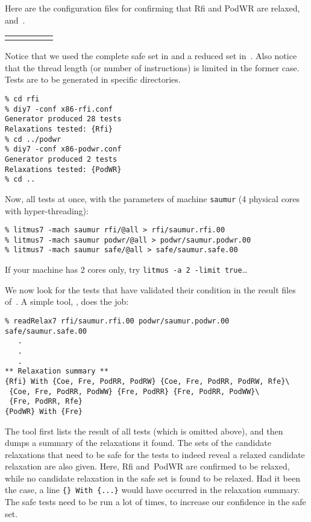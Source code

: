 Here are the configuration files for confirming
that Rfi and PodWR are relaxed, 
and~.
\begin{center}\small
\begin{tabular}{p{0.7\linewidth}@{\quad}|@{\quad}p{0.2\linewidth}}
 &

\end{tabular}
\end{center}
Notice that we used the complete safe set in
 and a reduced set in~.
Also notice that the thread length (or number of instructions) is limited in the former case.
Tests are to be generated in specific directories.
\begin{verbatim}
% cd rfi
% diy7 -conf x86-rfi.conf
Generator produced 28 tests
Relaxations tested: {Rfi}
% cd ../podwr
% diy7 -conf x86-podwr.conf
Generator produced 2 tests
Relaxations tested: {PodWR}
% cd ..
\end{verbatim}

Now,  all tests at once, with the
parameters of machine \texttt{saumur} (4 physical cores with hyper-threading):
\begin{verbatim}
% litmus7 -mach saumur rfi/@all > rfi/saumur.rfi.00
% litmus7 -mach saumur podwr/@all > podwr/saumur.podwr.00
% litmus7 -mach saumur safe/@all > safe/saumur.safe.00
\end{verbatim}
If your machine has 2 cores only, try \verb+litmus -a 2 -limit true+\ldots

\label{readRelax:intro}We now look for
the tests that have validated their condition
in the result files of~\litmus.
A simple tool, \readRelax, does the job:
\begin{verbatim}
% readRelax7 rfi/saumur.rfi.00 podwr/saumur.podwr.00 safe/saumur.safe.00
   .
   .
   .
** Relaxation summary **
{Rfi} With {Coe, Fre, PodRR, PodRW} {Coe, Fre, PodRR, PodRW, Rfe}\
 {Coe, Fre, PodRR, PodWW} {Fre, PodRR} {Fre, PodRR, PodWW}\
 {Fre, PodRR, Rfe}
{PodWR} With {Fre}
\end{verbatim}
The tool \readRelax{} first lists the result of all tests
(which is omitted above), and then dumps a summary of the
relaxations it found.
The sets of the candidate relaxations  that need to be safe for the tests to
indeed reveal  a relaxed candidate relaxation are also given.
Here, Rfi and~PodWR are confirmed to be relaxed, while no candidate relaxation
in the safe set is found to be relaxed.
Had it been the case, a line \verb+{} With {...}+ would have occurred
in the relaxation summary.
The safe tests need to be run a lot of times, to increase our
confidence in the safe set.

